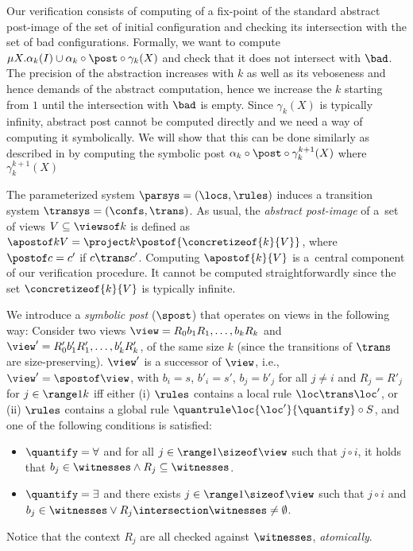 Our verification consists of computing of a fix-point of the standard abstract post-image of the set of initial configuration and checking its intersection with the set of bad configurations. 
Formally, we want to compute $\mu X.\alpha_k(I)\cup \alpha_k\circ \post \circ \gamma_k (X)$ and check that it does not intersect with $\bad$.
The precision of the abstraction increases with $k$ as well as its veboseness and hence demands of the abstract computation, hence we increase the $k$ starting from $1$ until the intersection with $\bad$ is empty.
Since $\gamma_k(X)$ is typically infinity, abstract post cannot be computed directly and we need a way of computing it symbolically. We will show that this can be done similarly as described in \cite{AbHaHo:view:abstraction} by computing the symbolic post $\alpha_k\circ \post \circ \gamma_k^{k+1} (X)$ where $\gamma_k^{k+1} (X)$



The parameterized system $\parsys=(\locs,\rules)$ induces a transition
system $\transys = (\confs,\trans)$. As usual, the \emph{abstract
  post-image} of a~set of views $V\subseteq\viewsof k$ is defined as
$\apostof k V = \project k {\postof {\concretizeof{k}{V}}}$, where
$\postof c = c'$ if $c\trans c'$. %
Computing $\apostof{k}{V}$ is a~central component of our verification
procedure. %
It cannot be computed straightforwardly since the set
$\concretizeof{k}{V}$ is typically infinite.

We introduce a \emph{symbolic post} ($\spost$) that operates on views
in the following way:
%
Consider two views $\view = R_0b_1R_1,\ldots,b_kR_k$ and $\view' =
R'_0b'_1R'_1,\ldots,b'_kR'_k$, of the same size $k$ (since the
transitions of $\trans$ are size-preserving). %
$\view'$ is a successor of $\view$, i.e., $\view' = \spostof \view$,
with $b_i = s$, $b'_i = s'$, $b_j=b'_j$ for all $j\neq i$ and $R_j=R'_j$ for $j\in\range 1 k$ iff either (i) $\rules$
contains a local rule $\loc\trans\loc'$, or (ii) $\rules$ contains a
global rule $\quantrule\loc{\loc'}{\quantify}\circ S$, and one of the
following conditions is satisfied:
\begin{itemize}%
\item 
$\quantify=\forall$ and for all $j\in\range 1 {\sizeof \view}$ such that $j\circ i$, it holds that $b_j\in \witnesses \wedge R_j\subseteq\witnesses$.
\item 
$\quantify=\exists$ and there exists $j\in\range 1 {\sizeof \view}$ such that $j\circ i$ and $b_j\in \witnesses \vee R_j\intersection\witnesses\neq\emptyset$.
\end{itemize}
\noindent%
Notice that the context $R_j$ are all checked against $\witnesses$,
\emph{atomically}.


